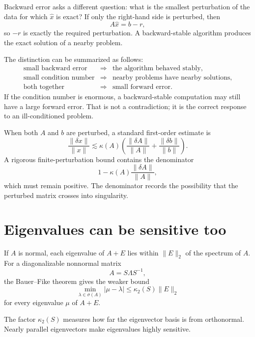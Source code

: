 Backward error asks a different question: what is the smallest perturbation of the data for which \(\widehat x\) is exact?  If only the right-hand side is perturbed, then
\[
  A\widehat x=b-r,
\]
so \(-r\) is exactly the required perturbation.  A backward-stable algorithm produces the exact solution of a nearby problem.

The distinction can be summarized as follows:
\[
\begin{array}{ccl}
\text{small backward error} &\Rightarrow& \text{the algorithm behaved stably},\\
\text{small condition number} &\Rightarrow& \text{nearby problems have nearby solutions},\\
\text{both together} &\Rightarrow& \text{small forward error}.
\end{array}
\]
If the condition number is enormous, a backward-stable computation may still have a large forward error.  That is not a contradiction; it is the correct response to an ill-conditioned problem.

When both \(A\) and \(b\) are perturbed, a standard first-order estimate is
\[
  \frac{\|\delta x\|}{\|x\|}
  \lesssim
  \kappa(A)
  \left(
    \frac{\|\delta A\|}{\|A\|}
    +
    \frac{\|\delta b\|}{\|b\|}
  \right).
\]
A rigorous finite-perturbation bound contains the denominator
\[
  1-\kappa(A)\frac{\|\delta A\|}{\|A\|},
\]
which must remain positive.  The denominator records the possibility that the perturbed matrix crosses into singularity.

\section{Eigenvalues can be sensitive too}

If \(A\) is normal, each eigenvalue of \(A+E\) lies within \(\|E\|_2\) of the spectrum of \(A\).  For a diagonalizable nonnormal matrix
\[
  A=S\Lambda S^{-1},
\]
the Bauer--Fike theorem gives the weaker bound
\[
  \min_{\lambda\in\sigma(A)}|\mu-\lambda|
  \le
  \kappa_2(S)\|E\|_2
\]
for every eigenvalue \(\mu\) of \(A+E\).

The factor \(\kappa_2(S)\) measures how far the eigenvector basis is from orthonormal.  Nearly parallel eigenvectors make eigenvalues highly sensitive.

